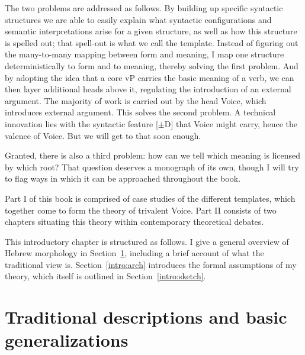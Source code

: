 The two problems are addressed as follows. By building up specific syntactic structures we are able to easily explain what syntactic configurations and semantic interpretations arise for a given structure, as well as how this structure is spelled out; that spell-out is what we call the template. Instead of figuring out the many-to-many mapping between form and meaning, I map one structure deterministically to form and to meaning, thereby solving the first problem. And by adopting the idea that a core vP carries the basic meaning of a verb, we can then layer additional heads above it, regulating the introduction of an external argument. The majority of work is carried out by the head Voice, which introduces external argument. This solves the second problem. A technical innovation lies with the syntactic feature [$\pm$D] that Voice might carry, hence the valence of Voice. But we will get to that soon enough.

Granted, there is also a third problem: how can we tell which meaning is licensed by which root? That question deserves a monograph of its own, though I will try to flag ways in which it can be approached throughout the book.

Part I of this book is comprised of case studies of the different templates, which together come to form the theory of trivalent Voice. Part II consists of two chapters situating this theory within contemporary theoretical debates.

This introductory chapter is structured as follows. I give a general overview of Hebrew morphology in Section~\ref{intro:basic}, including a brief account of what the traditional view is. Section~\ref{intro:arch} introduces the formal assumptions of my theory, which itself is outlined in Section~\ref{intro:sketch}.


\section{Traditional descriptions and basic generalizations} \label{intro:basic}

